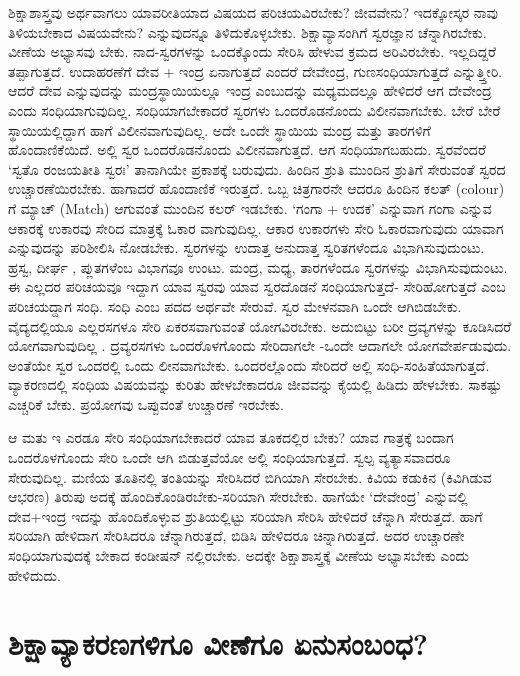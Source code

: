 ಶಿಕ್ಷಾಶಾಸ್ತ್ರವು ಅರ್ಥವಾಗಲು ಯಾವರೀತಿಯಾದ ವಿಷಯದ ಪರಿಚಯವಿರಬೇಕು? ಜೀವವೇನು? ಇದಕ್ಕೋಸ್ಕರ ನಾವು ತಿಳಿಯಬೇಕಾದ ವಿಷಯವೇನು? ಎನ್ನುವುದನ್ನೂ ತಿಳಿದುಕೊಳ್ಳಬೇಕು. ಶಿಕ್ಷಾವ್ಯಾಸಂಗಿಗೆ ಸ್ವರಜ್ಞಾನ ಚೆನ್ನಾಗಿರಬೇಕು. ವೀಣೆಯ ಅಭ್ಯಾಸವು ಬೇಕು. ನಾದ-ಸ್ವರಗಳನ್ನು ಒಂದಕ್ಕೊಂದು ಸೇರಿಸಿ ಹೇಳುವ ಕ್ರಮದ ಅರಿವಿರಬೇಕು. ಇಲ್ಲದಿದ್ದರೆ ತಪ್ಪಾಗುತ್ತದೆ. ಉದಾಹರಣೆಗೆ ದೇವ + ಇಂದ್ರ  ಏನಾಗುತ್ತದೆ ಎಂದರೆ ದೇವೇಂದ್ರ, ಗುಣಸಂಧಿಯಾಗುತ್ತದೆ ಎನ್ನುತ್ತ್ತೀರಿ. ಆದರೆ ದೇವ ಎನ್ನುವುದನ್ನು ಮಂದ್ರಸ್ಥಾಯಿಯಲ್ಲೂ ಇಂದ್ರ ಎಂಬುದನ್ನು ಮಧ್ಯಮದಲ್ಲೂ  ಹೇಳಿದರೆ ಆಗ ದೇವೇಂದ್ರ ಎಂದು ಸಂಧಿಯಾಗುವುದಿಲ್ಲ. ಸಂಧಿಯಾಗಬೇಕಾದರೆ ಸ್ವರಗಳು ಒಂದರೊಡನೊಂದು ವಿಲೀನವಾಗಬೇಕು. ಬೇರೆ ಬೇರೆ ಸ್ಥಾಯಿಯಲ್ಲಿದ್ದಾಗ ಹಾಗೆ ವಿಲೀನವಾಗುವುದಿಲ್ಲ. ಅದೇ ಒಂದೇ ಸ್ಥಾಯಿಯ ಮಂದ್ರ ಮತ್ತು ತಾರಗಳಿಗೆ ಹೊಂದಾಣಿಕೆಯಿದೆ. ಅಲ್ಲಿ ಸ್ವರ ಒಂದರೊಡನೊಂದು ವಿಲೀನವಾಗುತ್ತದೆ. ಆಗ ಸಂಧಿಯಾಗಬಹುದು. ಸ್ವರವೆಂದರೆ `ಸ್ವತೊ ರಂಜಯತೀತಿ ಸ್ವರಃ' ತಾನಾಗಿಯೇ ಪ್ರಕಾಶಕ್ಕೆ ಬರುವುದು. ಹಿಂದಿನ ಶ್ರುತಿ ಮುಂದಿನ ಶ್ರುತಿಗೆ ಸೇರುವಂತೆ ಸ್ವರದ ಉಚ್ಚಾರಣೆಯಿರಬೇಕು. ಹಾಗಾದರೆ ಹೊಂದಾಣಿಕೆ ಇರುತ್ತದೆ. ಒಬ್ಬ ಚಿತ್ರಗಾರನೇ ಆದರೂ ಹಿಂದಿನ ಕಲತ್ {(\eng colour)} ಗೆ ಮ್ಯಾಚ್ {(\eng Match)} ಆಗುವಂತೆ ಮುಂದಿನ ಕಲರ್ ಇಡಬೇಕು. `ಗಂಗಾ + ಉದಕ' ಎನ್ನುವಾಗ ಗಂಗಾ ಎನ್ನುವ ಆಕಾರಕ್ಕೆ  ಉಕಾರವು ಸೇರಿದ ಮಾತ್ರಕ್ಕೆ  ಓಕಾರ ವಾಗುವುದಿಲ್ಲ. ಆಕಾರ ಉಕಾರಗಳು ಸೇರಿ ಓಕಾರವಾಗುವುದು ಯಾವಾಗ ಎನ್ನುವುದನ್ನು ಪರಿಶೀಲಿಸಿ ನೋಡಬೇಕು. ಸ್ವರಗಳನ್ನು ಉದಾತ್ತ ಅನುದಾತ್ತ ಸ್ವರಿತಗಳೆಂದೂ ವಿಭಾಗಿಸುವುದುಂಟು. ಹ್ರಸ್ವ, ದೀರ್ಘ , ಪ್ಲುತಗಳೆಂಬ ವಿಭಾಗವೂ ಉಂಟು. ಮಂದ್ರ, ಮಧ್ಯ, ತಾರಗಳೆಂದೂ ಸ್ವರಗಳನ್ನು  ವಿಭಾಗಿಸುವುದುಂಟು. ಈ ಎಲ್ಲದರ ಪರಿಚಯವೂ ಇದ್ದಾಗ ಯಾವ ಸ್ವರವು ಯಾವ ಸ್ವರದೊಡನೆ ಸಂಧಿಯಾಗುತ್ತದೆ- ಸೇರಿಹೋಗುತ್ತದೆ ಎಂಬ ಪರಿಚಯದ್ದಾಗ ಸಂಧಿ. ಸಂಧಿ ಎಂಬ ಪದದ ಅರ್ಥವೇ ಸೇರುವೆ. ಸ್ವರ ಮೇಳನವಾಗಿ ಒಂದೇ ಆಗಿಬಿಡಬೇಕು. ವೈದ್ಯದಲ್ಲಿಯೂ ಎಲ್ಲರಸಗಳೂ ಸೇರಿ  ಏಕರಸವಾಗುವಂತೆ ಯೋಗವಿರಬೇಕು. ಅದುಬಿಟ್ಟು ಬರೀ ದ್ರವ್ಯಗಳನ್ನು ಕೂಡಿಸಿದರೆ ಯೋಗವಾಗುವುದಿಲ್ಲ .  ದ್ರವ್ಯರಸಗಳು ಒಂದರೊಳಗೊಂದು ಸೇರಿದಾಗಲೇ -ಒಂದೇ ಆದಾಗಲೇ ಯೋಗವೇರ್ಪಡುವುದು. ಅಂತೆಯೇ ಸ್ವರ ಒಂದರಲ್ಲಿ ಒಂದು ಲೀನವಾಗಬೇಕು. ಒಂದರಲ್ಲೊಂದು ಸೇರಿದರೆ ಅಲ್ಲಿ ಸಂಧಿ-ಸಂಹಿತೆಯಾಗುತ್ತದೆ. ವ್ಯಾಕರಣದಲ್ಲಿ ಸಂಧಿಯ ವಿಷಯವನ್ನು ಕುರಿತು ಹೇಳಬೇಕಾದರೂ ಜೀವವನ್ನು ಕೈಯಲ್ಲಿ ಹಿಡಿದು ಹೇಳಬೇಕು. ಸಾಕಷ್ಟು ಎಚ್ಚರಿಕೆ ಬೇಕು. ಪ್ರಯೋಗವು ಒಪ್ಪುವಂತೆ ಉಚ್ಚಾರಣೆ ಇರಬೇಕು.

ಆ ಮತು ಇ ಎರಡೂ ಸೇರಿ ಸಂಧಿಯಾಗಬೇಕಾದರೆ ಯಾವ ತೂಕದಲ್ಲಿರ ಬೇಕು? ಯಾವ ಗಾತ್ರಕ್ಕೆ  ಬಂದಾಗ ಒಂದರೊಳಗೊಂದು ಸೇರಿ ಒಂದೇ ಆಗಿ ಬಿಡುತ್ತವೆಯೋ ಅಲ್ಲಿ ಸಂಧಿಯಾಗುತ್ತದೆ. ಸ್ವಲ್ಪ  ವ್ಯತ್ಯಾಸವಾದರೂ ಸೇರುವುದಿಲ್ಲ. ಮಣಿಯ ತೂತಿನಲ್ಲಿ  ತಂತಿಯನ್ನು  ಸೇರಿಸಿದರೆ ಬಿಗಿಯಾಗಿ ಸೇರಬೇಕು. ಕಿವಿಯ ಕಡುಕಿನ (ಕಿವಿಗಿಡುವ ಆಭರಣ) ತಿರುಪು ಅದಕ್ಕೆ  ಹೊಂದಿಕೊಂಡಿರಬೇಕು-ಸರಿಯಾಗಿ ಸೇರಬೇಕು. ಹಾಗೆಯೇ `ದೇವೇಂದ್ರ' ಎನ್ನುವಲ್ಲಿ ದೇವ+ಇಂದ್ರ ಇದನ್ನು  ಹೊಂದಿಕೊಳ್ಳುವ ಶ್ರುತಿಯಲ್ಲಿಟ್ಟು ಸರಿಯಾಗಿ ಸೇರಿಸಿ ಹೇಳಿದರೆ ಚೆನ್ನಾಗಿ ಸೇರುತ್ತದೆ. ಹಾಗೆ ಸರಿಯಾಗಿ ಹೇಳಿದಾಗ ಸೇರಿಸಿದರೂ ಚೆನ್ನಾಗಿರುತ್ತದೆ, ಬಿಡಿಸಿ ಹೇಳಿದರೂ ಚಿನ್ನಾಗಿರುತ್ತದೆ. ಅದರ ಉಚ್ಚಾರಣೇ ಸಂಧಿಯಾಗುವುದಕ್ಕೆ ಬೇಕಾದ ಕಂಡೀಷನ್ ನಲ್ಲಿರಬೇಕು. ಅದಕ್ಕೇ ಶಿಕ್ಷಾಶಾಸ್ತ್ರಕ್ಕೆ ವೀಣೆಯ ಅಭ್ಯಾಸಬೇಕು ಎಂದು ಹೇಳಿದುದು.

\section*{ಶಿಕ್ಷಾವ್ಯಾಕರಣಗಳಿಗೂ ವೀಣೆಗೂ ಏನುಸಂಬಂಧ?}

